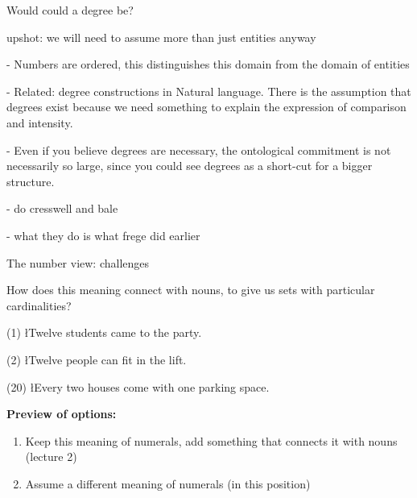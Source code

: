 \documentclass[pdf,12pt]{beamer}
\begin{document}
\begin{frame}{Would could a degree be?}
{upshot: we will need to assume more than just entities anyway

  - Numbers are ordered, this distinguishes this domain from the domain of entities

  - Related: degree constructions in Natural language. There is the assumption that degrees exist because we need something to explain the expression of comparison and intensity.

  - Even if you believe degrees are necessary, the ontological commitment is not necessarily so large, since you could see degrees as a short-cut for a bigger structure.

  - do cresswell and bale

  - what they do is what frege did earlier
 } 
  

\end{frame}

\begin{frame}{The number view: challenges}

  How does this meaning connect with nouns, to give us sets with particular cardinalities?

  (1) \l{Twelve students came to the party.}

  (2) \l{Twelve people can fit in the lift.}
  
  (20) \l{Every two houses come with one parking space.}


  \pause \vfill

  {\bf Preview of options:}
\begin{enumerate}
\item  Keep this meaning of numerals, add something that connects it with nouns (lecture 2)
\item Assume a different meaning of numerals (in this position)
\end{enumerate}    
   
\end{frame}
\end{document}
